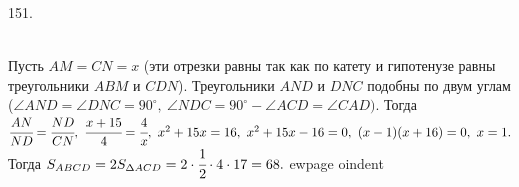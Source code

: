 151. \begin{figure}[ht!]
\end{figure}\\
Пусть $AM=CN=x$ (эти отрезки равны так как по катету и гипотенузе равны треугольники $ABM$ и $CDN$). Треугольники $AND$ и $DNC$ подобны по двум  углам ($\angle AND=\angle DNC=90^\circ,\ \angle NDC=90^\circ-\angle ACD=\angle CAD).$ Тогда $\cfrac{AN}{ND}=\cfrac{ND}{CN},\ \cfrac{x+15}{4}=\cfrac{4}{x},\ x^2+15x=16,\ x^2+15x-16=0,\
(x-1)(x+16)=0,\ x=1.$ Тогда $S_{ABCD}=2S_{\Delta ACD}=2\cdot\cfrac{1}{2}\cdot4\cdot17=68.$
ewpage
oindent
